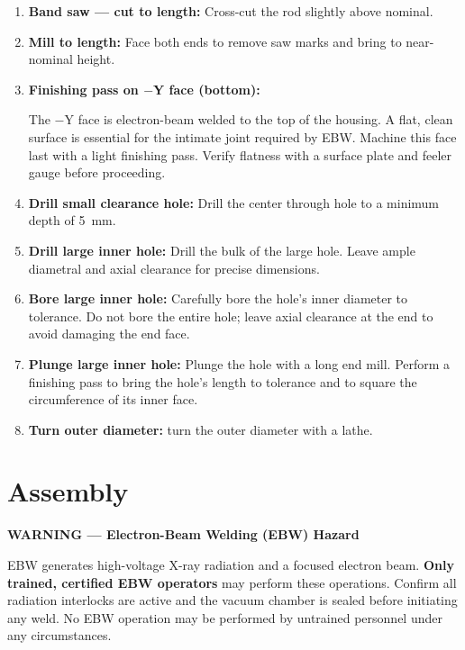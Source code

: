 \documentclass[12pt, letterpaper]{report}%
\begin{document}
\begin{enumerate}[itemsep=4pt]
	\item \textbf{Band saw --- cut to length:} Cross-cut the rod slightly above
				nominal.
	\item \textbf{Mill to length:} Face both ends to remove saw marks and bring to
				near-nominal height.
	\item \textbf{Finishing pass on $-$Y face (bottom):}
				\begin{notebox}
				The $-$Y face is electron-beam welded to the top of the housing. A flat,
				clean surface is essential for the intimate joint
				required by EBW. Machine this face last with a
				light finishing pass. Verify flatness with a surface plate and feeler gauge
				before proceeding.
				\end{notebox}
	\item \textbf{Drill small clearance hole:} Drill
				the center through hole to a minimum depth of \SI{5}{\milli\meter}.
	\item \textbf{Drill large inner hole:}
				Drill the bulk of the large hole. Leave ample diametral and axial clearance for
				precise dimensions.
	\item \textbf{Bore large inner hole:}
				Carefully bore the hole's inner diameter to tolerance.
				Do not bore the entire hole; leave axial clearance at the end to avoid
				damaging the end face.
	\item \textbf{Plunge large inner hole:}
				Plunge the hole with a long end mill. Perform a finishing pass to bring the
				hole's length to tolerance and to square the circumference of its inner face.
	\item \textbf{Turn outer diameter:} turn the outer diameter with a lathe.
\end{enumerate}

\section{Assembly}
\label{sec:assy}

\begin{warningbox}
\textbf{\textcolor{warnred}{WARNING --- Electron-Beam Welding (EBW) Hazard}}

EBW generates high-voltage X-ray radiation and a focused electron beam.
\textbf{Only trained, certified EBW operators} may perform these operations.
Confirm all radiation interlocks are active and the vacuum chamber is sealed
before initiating any weld. No EBW operation may be performed by untrained
personnel under any circumstances.
\end{warningbox}
\end{document}
